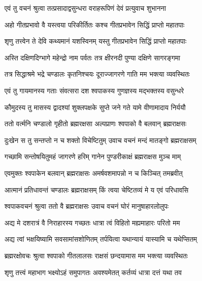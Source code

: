 \twolineshloka
{एवं तु वचनं श्रुत्वा तत्प्रसादाद्वसुन्धरा}
{वराहरूपिणं देवं प्रत्युवाच शुभानना}%


\twolineshloka
{अहो गीतप्रभावो वै यस्त्वया परिकीर्तितः}
{कश्च गीतप्रभावेन सिद्धिं प्राप्तो महातपाः}%



\twolineshloka
{शृणु तत्त्वेन ते देवि कथ्यमानं यशस्विनम्}
{यस्तु गीतप्रभावेन सिद्धिं प्राप्तो महातपाः}%

\twolineshloka
{अस्ति दक्षिणदिग्भागे महेन्द्रो नाम पर्वतः}
{तत्र क्षीरनदी पुण्या दक्षिणे सागरङ्गमा}%

\twolineshloka
{तत्र सिद्धाश्रमे भद्रे चण्डालः कृतनिश्चयः}
{दूराज्जागरणे गाति मम भक्त्या व्यवस्थितः}%

\twolineshloka
{एवं तु गायमानस्य गताः संवत्सरा दश}
{श्वपाकस्य गुणज्ञस्य मद्भक्तस्य वसुन्धरे}%

\twolineshloka
{कौमुदस्य तु मासस्य द्वादश्यां शुक्लपक्षके}
{सुप्ते जने गते यामे वीणामादाय निर्ययौ}%

\twolineshloka
{ततो वर्त्मनि चण्डालो गृहीतो ब्रह्मरक्षसा}
{अल्पप्राणः श्वपाको वै बलवान् ब्रह्मराक्षसः}%

\twolineshloka
{दुःखेन स तु सन्तप्तो न च शक्तो विचेष्टितुम्}
{उवाच वचनं मन्दं मातङ्गो ब्रह्मराक्षसम्}%

\twolineshloka
{गच्छामि सन्तोषयितुमहं जागरणे हरिम्}
{गानेन पुण्डरीकाक्षं ब्रह्मराक्षस मुञ्च माम्}%

\twolineshloka
{एवमुक्तः श्वपाकेन बलवान् ब्रह्मराक्षसः}
{अमर्षवशमापन्नो न च किञ्चित् तमब्रवीत्}%

\twolineshloka
{आत्मानं प्रतिधावन्तं चण्डालः ब्रह्मराक्षसम्}
{किं त्वया चेष्टितव्यं मे य एवं परिधावसि}%

\twolineshloka
{श्वपाकवचनं श्रुत्वा ततो वै ब्रह्मराक्षसः}
{उवाच वचनं घोरं मानुषाहारलोलुपः}%

\twolineshloka
{अद्य मे दशरात्रं वै निराहारस्य गच्छतः}
{धात्रा त्वं विहितो मह्यमाहारः परितो मम}%

\twolineshloka
{अद्य त्वां भक्षयिष्यामि सवसामांसशोणितम्}
{तर्पयित्वा यथान्यायं यास्यामि च यथेप्सितम्}%

\twolineshloka
{ब्रह्मरक्षोवचः श्रुत्वा श्वपाको गीतलालसः}
{राक्षसं छन्दयामास मम भक्त्या व्यवस्थितः}%

\twolineshloka
{शृणु तत्त्वं महाभाग भक्ष्योऽहं समुपागतः}
{अवश्यमेतत् कर्तव्यं धात्रा दत्तं यथा तव}%

